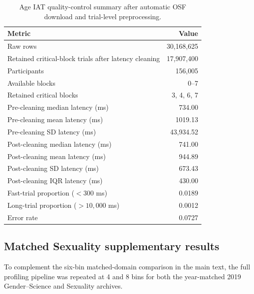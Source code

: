 \documentclass[12pt]{article}
\begin{document}
\begin{table}[htbp]
\centering
\caption{Age IAT quality-control summary after automatic OSF download and trial-level preprocessing.}
\label{tab:age-iat-qc}
\small
\begin{tabular}{@{}lr@{}}
\toprule
Metric & Value \\
\midrule
Raw rows & 30{,}168{,}625 \\
Retained critical-block trials after latency cleaning & 17{,}907{,}400 \\
Participants & 156{,}005 \\
Available blocks & 0--7 \\
Retained critical blocks & 3, 4, 6, 7 \\
Pre-cleaning median latency (ms) & 734.00 \\
Pre-cleaning mean latency (ms) & 1019.13 \\
Pre-cleaning SD latency (ms) & 43{,}934.52 \\
Post-cleaning median latency (ms) & 741.00 \\
Post-cleaning mean latency (ms) & 944.89 \\
Post-cleaning SD latency (ms) & 673.43 \\
Post-cleaning IQR latency (ms) & 430.00 \\
Fast-trial proportion ($<300$ ms) & 0.0189 \\
Long-trial proportion ($>10{,}000$ ms) & 0.0012 \\
Error rate & 0.0727 \\
\bottomrule
\end{tabular}
\end{table}

\subsection*{Matched Sexuality supplementary results}

To complement the six-bin matched-domain comparison in the main text, the full profiling pipeline was repeated at 4 and 8 bins for both the year-matched 2019 Gender--Science and Sexuality archives.

\begin{table}[htbp]
\centering
\caption{Matched 2019 public-domain pooled \(\theta\) summaries by binning resolution.}
\label{tab:supp-matched-bins}
\footnotesize
\resizebox{\textwidth}{!}{}
\end{table}
\end{document}
